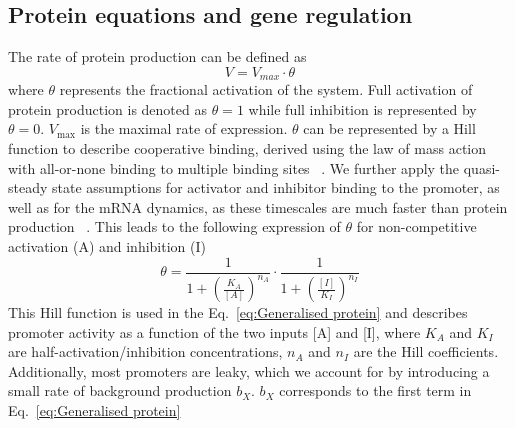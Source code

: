 \subsection{Protein equations and gene regulation}\label{Protein equations and gene regulation}
The rate of protein production can be defined as
\begin{equation}
    V = V_{max} \cdot \theta
    \label{eq: vmax}
\end{equation}
where $\theta$ represents the fractional activation of the system. Full activation of protein production is denoted as $\theta=1$ while full inhibition is represented by $\theta=0$.
$V_{\max}$ is the maximal rate of expression.
$\theta$ can be represented by a Hill function to describe cooperative binding, derived using the law of mass action with all-or-none binding to multiple binding sites ~\parencite{Weiss1997}.
We further apply the quasi-steady state assumptions for activator and inhibitor binding to the promoter, as well as for the mRNA dynamics, as these timescales are much faster than protein production ~\parencite{Andersen1998, Bremer2008}.
This leads to the following expression of $\theta$ for non-competitive activation (A) and inhibition (I)
\begin{equation}
    \theta= \frac{1}{1+\left(\frac{K_{A}}{[A]}\right)^{n_{A}}} \cdot \frac{1}{1+\left(\frac{[I]}{K_{I}}\right)^{n_{I}}}
    \label{eq:theta}
\end{equation}
This Hill function is used in the Eq.~\ref{eq:Generalised protein} and describes promoter activity as a function of the two inputs [A] and [I], where $K_{A}$ and $K_{I}$ are half-activation/inhibition concentrations, $n_{A}$ and $n_{I}$ are the Hill coefficients.
Additionally, most promoters are leaky, which we account for by introducing a small rate of background production $b_{X}$. $b_{X}$ corresponds to the first term in Eq.~\ref{eq:Generalised protein}


